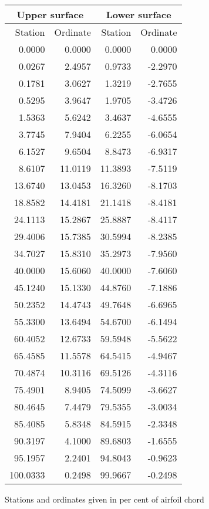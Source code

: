 \documentclass[11pt]{book}
\begin{document}
 \hspace{4mm}
 \begin{tabular}{|r|r|r|r|} \hline 
 \multicolumn{2}{|c|}{Upper surface} & \multicolumn{2}{|c|}{Lower surface} \\
 \hline
 Station & Ordinate & Station & Ordinate \\
 \hline
0.0000 & 0.0000 & 0.0000 & 0.0000 \\
0.0267 & 2.4957 & 0.9733 & -2.2970 \\
0.1781 & 3.0627 & 1.3219 & -2.7655 \\
0.5295 & 3.9647 & 1.9705 & -3.4726 \\
1.5363 & 5.6242 & 3.4637 & -4.6555 \\
3.7745 & 7.9404 & 6.2255 & -6.0654 \\
6.1527 & 9.6504 & 8.8473 & -6.9317 \\
8.6107 & 11.0119 & 11.3893 & -7.5119 \\
13.6740 & 13.0453 & 16.3260 & -8.1703 \\
18.8582 & 14.4181 & 21.1418 & -8.4181 \\
24.1113 & 15.2867 & 25.8887 & -8.4117 \\
29.4006 & 15.7385 & 30.5994 & -8.2385 \\
34.7027 & 15.8310 & 35.2973 & -7.9560 \\
40.0000 & 15.6060 & 40.0000 & -7.6060 \\
45.1240 & 15.1330 & 44.8760 & -7.1886 \\
50.2352 & 14.4743 & 49.7648 & -6.6965 \\
55.3300 & 13.6494 & 54.6700 & -6.1494 \\
60.4052 & 12.6733 & 59.5948 & -5.5622 \\
65.4585 & 11.5578 & 64.5415 & -4.9467 \\
70.4874 & 10.3116 & 69.5126 & -4.3116 \\
75.4901 & 8.9405 & 74.5099 & -3.6627 \\
80.4645 & 7.4479 & 79.5355 & -3.0034 \\
85.4085 & 5.8348 & 84.5915 & -2.3348 \\
90.3197 & 4.1000 & 89.6803 & -1.6555 \\
95.1957 & 2.2401 & 94.8043 & -0.9623 \\
100.0333 & 0.2498 & 99.9667 & -0.2498 \\
 \hline 
 \end{tabular}
 \vspace{8mm}

Stations and ordinates given in per cent of airfoil chord
\end{document}
